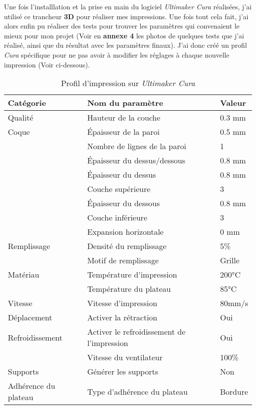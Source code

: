 \vspace{0.5cm}
Une fois l'installlation et la prise en main du logiciel \textit{Ultimaker Cura} \cite{noauthor_ultimaker_nodate} réalisées, j'ai utilisé ce trancheur \textbf{3D} pour réaliser mes impressions. Une fois tout cela fait, j'ai alors enfin pu réaliser des tests pour trouver les paramètres qui convenaient le mieux pour mon projet (Voir en \textbf{annexe 4} les photos de quelques tests que j'ai réalisé, ainsi que du résultat avec les paramètres finaux). J'ai donc créé un profil \textit{Cura} spécifique pour ne pas avoir à modifier les réglages à chaque nouvelle impression (Voir ci-dessous).

\vspace{0.5cm}
\begin{table}[!h]
    \centering
    \begin{tabular}{|l|l|l|}
        \hline Catégorie & Nom du paramètre & Valeur\\
        \hline Qualité & Hauteur de la couche & 0.3 mm\\
        \hline Coque & \'Epaisseur de la paroi & 0.5 mm\\
        \hline & Nombre de lignes de la paroi & 1\\
        \hline & \'Epaisseur du dessus/dessous & 0.8 mm\\
        \hline & \'Epaisseur du dessus & 0.8 mm\\
        \hline & Couche supérieure & 3\\
        \hline & \'Epaisseur du dessous & 0.8 mm\\
        \hline & Couche inférieure & 3\\
        \hline & Expansion horizontale & 0 mm\\
        \hline Remplissage & Densité du remplissage & 5\% \\
        \hline & Motif de remplissage & Grille\\
        \hline Matériau & Température d'impression & 200°C\\
        \hline & Température du plateau & 85°C\\
        \hline Vitesse & Vitesse d'impression & 80mm/s\\
        \hline Déplacement & Activer la rétraction & Oui\\
        \hline Refroidissement & Activer le refroidissement de l'impression & Oui\\
        \hline & Vitesse du ventilateur & 100\% \\
        \hline Supports & Générer les supports & Non \\
        \hline Adhérence du plateau & Type d'adhérence du plateau & Bordure \\
        \hline
    \end{tabular}
    \caption[\, \, Profil d'impression]{Profil d'impression sur \textit{Ultimaker Cura}}
    \label{tab_4.2.1.1}
\end{table}

